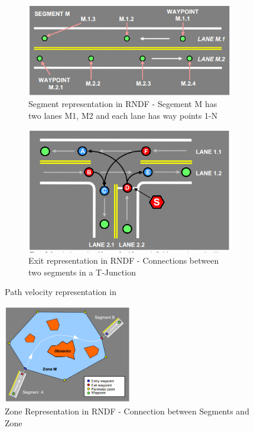 \begin{figure}
	\centering
	\begin{subfigure}{.56\textwidth}
	    \centering
		\includegraphics[width=1.0\textwidth]{Images/rndf_segment.png}
		\caption{Segment representation in RNDF - Segement M has two lanes M1, M2 and each lane has way points 1-N}
		\label{rndf_segment}
	\end{subfigure}%
	\begin{subfigure}{.44\textwidth}
		\centering
		\includegraphics[width=1.0\textwidth]{Images/rndf_exits.png}
		\caption{Exit representation in RNDF - Connections between two segments in a T-Junction}
		\label{rndf_exits}
	\end{subfigure}
	\caption{Path velocity representation in \cite{traj_planner_optimization}}
	\label{rndf_seg_exit}
\end{figure}

\begin{figure}
    \centering
    \includegraphics[width=0.5\textwidth]{Images/zone_segment.png}
    \caption{Zone Representation in RNDF - Connection between Segments and Zone}
    \label{zone_segment}
\end{figure}


